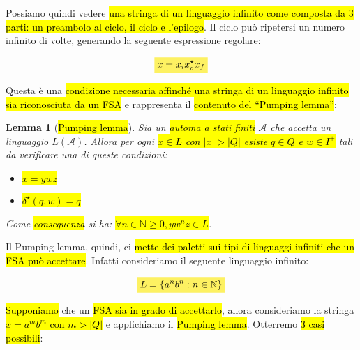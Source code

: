 \documentclass[a4paper,11pt,twoside]{article}
\theoremstyle{plain}
\newtheorem{lem}{Lemma}[section]
\theoremstyle{definition}
\theoremstyle{remark}
\newcommand{\mhl}[1]{\colorbox{hlcolor}{$\displaystyle #1$}}
\begin{document}
Possiamo quindi vedere \hl{una stringa di un linguaggio infinito come composta
da 3 parti: un preambolo al ciclo, il ciclo e l'epilogo}. Il ciclo può ripetersi
un numero infinito di volte, generando la seguente espressione regolare:

\begin{equation}
  \mhl{x = x_i x_c^\star x_f}
\end{equation}

Questa è una \hl{condizione necessaria affinché una stringa di un linguaggio
infinito sia riconosciuta da un FSA} e rappresenta il \hl{contenuto del
``Pumping lemma''}:

\begin{lem}[\hl{Pumping lemma}]\label{thm:pumping-lemma}
  Sia un \hl{automa a stati finiti} $\mathcal{A}$ che accetta un linguaggio
  $L(\mathcal{A})$. Allora per ogni \hl{$x \in L$ con $|x| > |Q|$ esiste $q \in
  Q$ e $w \in I^+$} tali da verificare una di queste condizioni:

  \begin{itemize}
    \item \hl{$x = ywz$}
    \item \hl{$\delta^\star(q,w) = q$}
  \end{itemize}

  Come \hl{conseguenza} si ha: \hl{$\forall n \in \mathbb{N} \geq 0, y w^n z \in
  L$}.
\end{lem}

Il Pumping lemma, quindi, ci \hl{mette dei paletti sui tipi di linguaggi
infiniti che un FSA può accettare}. Infatti consideriamo il seguente linguaggio
infinito:

\begin{equation}
  \mhl{L = \{ a^n b^n : n \in \mathbb{N} \}}
\end{equation}

\hl{Supponiamo} che un \hl{FSA sia in grado di accettarlo}, allora consideriamo
la stringa \hl{$x = a^m b^m$ con $m > |Q|$} e applichiamo il \hl{Pumping lemma}.
Otterremo \hl{3 casi possibili}:
\end{document}
